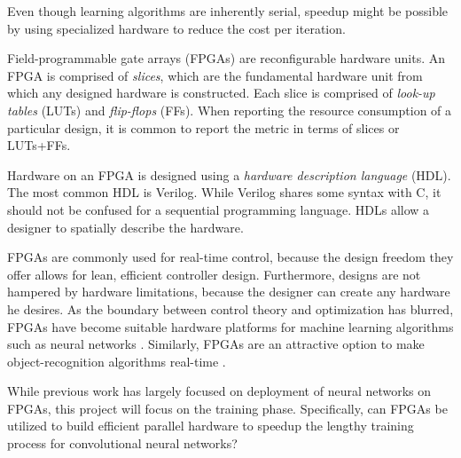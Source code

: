 Even though learning algorithms are inherently serial, speedup might be possible by using specialized hardware to reduce the cost per iteration.

Field-programmable gate arrays (FPGAs) are reconfigurable hardware units. An FPGA is comprised of \textit{slices}, which are the fundamental hardware unit from which any designed hardware is constructed. Each slice is comprised of \textit{look-up tables} (LUTs) and \textit{flip-flops} (FFs). When reporting the resource consumption of a particular design, it is common to report the metric in terms of slices or LUTs+FFs.

Hardware on an FPGA is designed using a \textit{hardware description language} (HDL). The most common HDL is Verilog. While Verilog shares some syntax with C, it should not be confused for a sequential programming language. HDLs allow a designer to spatially describe the hardware.

FPGAs are commonly used for real-time control, because the design freedom they offer allows for lean, efficient controller design. Furthermore, designs are not hampered by hardware limitations, because the designer can create any hardware he desires. As the boundary between control theory and optimization has blurred, FPGAs have become suitable hardware platforms for machine learning algorithms such as neural networks \cite{wang2008} \cite{skodzik2013}. Similarly, FPGAs are an attractive option to make object-recognition algorithms real-time \cite{ahn2015}.

While previous work has largely focused on deployment of neural networks on FPGAs, this project will focus on the training phase. Specifically, can FPGAs be utilized to build efficient parallel hardware to speedup the lengthy training process for convolutional neural networks?
